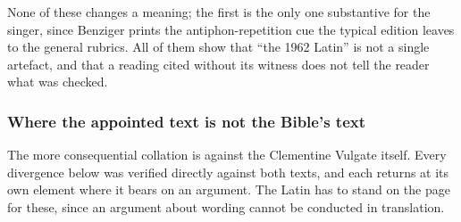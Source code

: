 None of these changes a meaning; the first is the only one substantive for the
singer, since Benziger prints the antiphon-repetition cue the typical edition
leaves to the general rubrics. All of them show that ``the 1962 Latin'' is not
a single artefact, and that a reading cited without its witness does not tell
the reader what was checked.

\subsubsection*{Where the appointed text is not the Bible's text}

The more consequential collation is against the Clementine Vulgate itself.
Every divergence below was verified directly against both texts, and each
returns at its own element where it bears on an argument. The Latin has to
stand on the page for these, since an argument about wording cannot be
conducted in translation.

